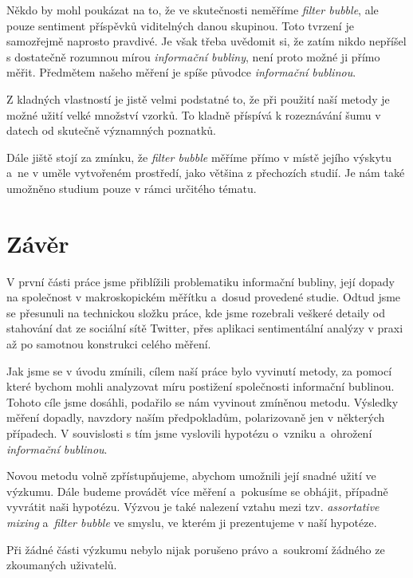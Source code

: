 \documentclass[12pt, a4paper]{article}
\numberwithin{equation}{section} 	%
\begin{document}
Někdo by mohl poukázat na to, že ve skutečnosti neměříme \textit{filter bubble}, ale pouze sentiment příspěvků viditelných danou skupinou. Toto tvrzení je samozřejmě naprosto pravdivé. Je však třeba uvědomit si, že zatím nikdo nepříšel s dostatečně rozumnou mírou \textit{informační bubliny}, není proto možné ji přímo měřit. Předmětem našeho měření je spíše původce \textit{informační bublinou}.

Z kladných vlastností je jistě velmi podstatné to, že při použití naší metody je možné užití velké množství vzorků. To kladně příspívá k rozeznávání šumu v datech od skutečně významných poznatků.

Dále jiště stojí za zmínku, že \textit{filter bubble} měříme přímo v místě jejího výskytu a~ne v uměle vytvořeném prostředí, jako většina z přechozích studií. Je nám také umožněno studium pouze v rámci určitého tématu.

\newpage
\section{Závěr}
\noindent V první části práce jsme přiblížili problematiku informační bubliny, její dopady na společnost v makroskopickém měřítku a~dosud provedené studie.  Odtud jsme se přesunuli na technickou složku práce, kde jsme rozebrali veškeré detaily od stahování dat ze sociální sítě Twitter, přes aplikaci sentimentální analýzy v praxi až po samotnou konstrukci celého měření.

Jak jsme se v úvodu zmínili, cílem naší práce bylo vyvinutí metody, za pomocí které bychom mohli analyzovat míru postižení společnosti informační bublinou. Tohoto cíle jsme dosáhli, podařilo se nám vyvinout zmíněnou metodu. Výsledky měření dopadly, navzdory naším předpokladům, polarizovaně jen v některých případech. V souvislosti s tím jsme vyslovili hypotézu o~vzniku a~ohrožení \textit{informační bublinou}.

Novou metodu volně zpřístupňujeme, abychom umožnili její snadné užití ve výzkumu. Dále budeme provádět více měření a~pokusíme se obhájit, případně vyvrátit naši hypotézu. Výzvou je také nalezení vztahu mezi tzv. \textit{assortative mixing} a~\textit{filter bubble} ve smyslu, ve kterém ji prezentujeme v naší hypotéze.

Při žádné části výzkumu nebylo nijak porušeno právo a~soukromí žádného ze zkoumaných uživatelů.
\end{document}
